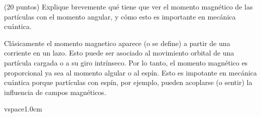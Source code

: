 \question [1] (20 puntos) Explique brevemente qué tiene que ver el momento magnético de las partículas con el momento angular, y cómo esto es importante en mecánica cuántica.

\begin{solution}

Clásicamente el momento magnetico aparece (o se define) a partir de una corriente en un lazo. Esto puede ser asociado al movimiento orbital de una partícula cargada o a su giro intrínseco. Por lo tanto, el momento magnético es proporcional ya sea al momento algular o al espín.
Esto es impotante en mecánica cuántica porque partículas con espín, por ejemplo, pueden acoplarse (o sentir) la influencia de campos magnéticos. 


\end{solution}

vspace{1.0cm}